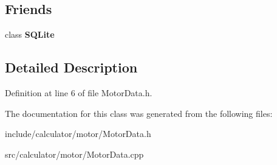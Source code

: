 \subsection*{Friends}
\begin{DoxyCompactItemize}
\item 
\mbox{\label{class_motor_data_ac7d22f3ca36435f73d55df60dc799e14}} 
class {\bfseries S\+Q\+Lite}
\end{DoxyCompactItemize}


\subsection{Detailed Description}


Definition at line 6 of file Motor\+Data.\+h.



The documentation for this class was generated from the following files\+:\begin{DoxyCompactItemize}
\item 
include/calculator/motor/Motor\+Data.\+h\item 
src/calculator/motor/Motor\+Data.\+cpp\end{DoxyCompactItemize}
